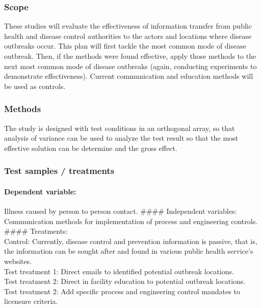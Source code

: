 \documentclass[11pt]{article}
\begin{document}
    \hypertarget{scope}{%
\subsubsection{Scope}\label{scope}}

These studies will evaluate the effectiveness of information transfer
from public health and disease control authorities to the actors and
locations where disease outbreaks occur. This plan will first tackle the
most common mode of disease outbreak. Then, if the methods were found
effective, apply those methods to the next most common mode of disease
outbreaks (again, conducting experiments to demonstrate effectiveness).
Current communication and education methods will be used as controls.

    \hypertarget{methods}{%
\subsubsection{Methods}\label{methods}}

The study is designed with test conditions in an orthogonal array, so
that analysis of variance can be used to analyze the test result so that
the most effective solution can be determine and the gross effect.

    \hypertarget{test-samples-treatments}{%
\subsubsection{Test samples /
treatments}\label{test-samples-treatments}}

\hypertarget{dependent-variable}{%
\paragraph{Dependent variable:}\label{dependent-variable}}

Illness caused by person to person contact. \#\#\#\# Independent
variables: Communication methods for implementation of process and
engineering controls.\\
\#\#\#\# Treatments:\\
Control: Currently, disease control and prevention information is
passive, that is, the information can be sought after and found in
various public health service's websites.\\
Test treatment 1: Direct emails to identified potential outbreak
locations.\\
Test treatment 2: Direct in facility education to potential outbreak
locations.\\
Test treatment 2: Add specific process and engineering control mandates
to licensure criteria.
\end{document}
